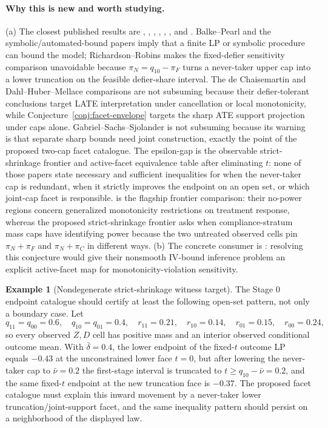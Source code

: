 \documentclass[11pt]{article}
\theoremstyle{definition}
\newtheorem{example}{Example}
\theoremstyle{plain}
\theoremstyle{remark}
\begin{document}
\paragraph{Why this is new and worth studying.}
(a) The closest published results are \citet{BalkePearl1997},
\citet{RichardsonRobins2010}, \citet{DeChaisemartin2017},
\citet{DahlHuberMellace2023}, \citet{SachsJonzonSjolanderGabriel2023},
\citet{GabrielSachsSjolander2023}, and
\citet{DuarteFinkelsteinKnoxMummoloShpitser2024}.  Balke--Pearl and the
symbolic/automated-bound papers imply that a finite LP or symbolic procedure
can bound the model; Richardson--Robins makes the fixed-defier sensitivity
comparison unavoidable because \(\pi_N=q_{10}-\pi_F\) turns a never-taker upper
cap into a lower truncation on the feasible defier-share interval.  The
de Chaisemartin and Dahl--Huber--Mellace comparisons are not subsuming because
their defier-tolerant conclusions target LATE interpretation under cancellation
or local monotonicity, while Conjecture~\ref{conj:facet-envelope} targets the
sharp ATE support projection under caps alone.  Gabriel--Sachs--Sjolander is
not subsuming because its warning is that separate sharp bounds need joint
construction, exactly the point of the proposed two-cap facet catalogue.  The
epsilon-gap is the observable strict-shrinkage frontier and active-facet
equivalence table after eliminating \(t\): none of those papers state
necessary and sufficient inequalities for when the never-taker cap is
redundant, when it strictly improves the endpoint on an open set, or which
joint-cap facet is responsible.  \citet{BaiHuangMoonShaikhVytlacil2024} is the
flagship frontier comparison: their no-power regions concern generalized
monotonicity restrictions on treatment response, whereas the proposed
strict-shrinkage frontier asks when compliance-stratum mass caps have
identifying power because the two untreated observed cells pin
\(\pi_N+\pi_F\) and \(\pi_N+\pi_C\) in different ways.  (b) The concrete consumer is
\citet{LevisBonviniZengKeeleKennedy2025}: resolving this conjecture would give
their nonsmooth IV-bound inference problem an explicit active-facet map for
monotonicity-violation sensitivity.

\begin{example}[Nondegenerate strict-shrinkage witness target]\label{ex:strict-shrinkage-target}
The Stage 0 endpoint catalogue should certify at least the following open-set
pattern, not only a boundary case.  Let
\[
q_{11}=q_{00}=0.6,\quad q_{10}=q_{01}=0.4,\quad
r_{11}=0.21,\quad r_{10}=0.14,\quad r_{01}=0.15,\quad r_{00}=0.24,
\]
so every observed \(Z,D\) cell has positive mass and an interior observed
conditional outcome mean.  With \(\bar\delta=0.4\), the lower endpoint of the
fixed-\(t\) outcome LP equals \(-0.43\) at the unconstrained lower face
\(t=0\), but after lowering the never-taker cap to \(\bar\nu=0.2\) the
first-stage interval is truncated to \(t\ge q_{10}-\bar\nu=0.2\), and the same
fixed-\(t\) endpoint at the new truncation face is \(-0.37\).  The proposed
facet catalogue must explain this inward movement by a never-taker lower
truncation/joint-support facet, and the same inequality pattern should persist
on a neighborhood of the displayed law.
\end{example}
\end{document}
